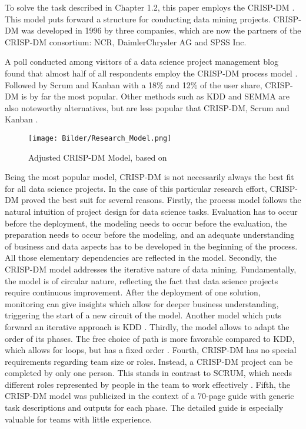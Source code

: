 To solve the task described in Chapter 1.2, this paper employs the \ac{CRISP-DM} \cite{CRISPDM2000}. This model puts forward a structure for conducting data mining projects. \ac{CRISP-DM} was developed in 1996 by three companies, which are now the partners of the \ac{CRISP-DM} consortium: NCR, DaimlerChrysler AG and SPSS Inc. 

A poll conducted among visitors of a data science project management blog found that almost half of all respondents employ the \ac{CRISP-DM} process model \cite{CRISPDMPopular2020} . Followed by Scrum and Kanban with a 18\% and 12\% of the user share, \ac{CRISP-DM} is by far the most popular. Other methods such as \ac{KDD} and \ac{SEMMA} are also noteworthy alternatives, but are less popular that CRISP-DM, Scrum and Kanban \cite{CRISPDMPopular2020} .

\begin{figure}[ht]
	\centering
	\texttt{[image: Bilder/Research\_Model.png]}
	\caption[Adjusted CRISP-DM Model]{Adjusted CRISP-DM Model, based on \cite[p.~13]{CRISPDM2000}}
	\label{fig:CRISM-DM}
\end{figure}

Being the most popular model, \ac{CRISP-DM} is not necessarily always the best fit for all data science projects. In the case of this particular research effort, \ac{CRISP-DM} proved the best suit for several reasons.
Firstly, the process model follows the natural intuition of project design for data science tasks. Evaluation has to occur before the deployment, the modeling needs to occur before the evaluation, the preparation needs to occur before the modeling, and an adequate understanding of business and data aspects has to be developed in the beginning of the process. All those elementary dependencies are reflected in the model.
Secondly, the \ac{CRISP-DM} model addresses the iterative nature of data mining. Fundamentally, the model is of circular nature, reflecting the fact that data science projects require continuous improvement. After the deployment of one solution, monitoring can give insights which allow for deeper business understanding, triggering the start of a new circuit of the model. Another model which puts forward an iterative approach is \ac{KDD} \cite[p.~41]{KDD}.
Thirdly, the model allows to adapt the order of its phases. The free choice of path is more favorable compared to \ac{KDD}, which allows for loops, but has a fixed order \cite[p.~42]{KDD}.
Fourth, \ac{CRISP-DM} has no special requirements regarding team size or roles. Instead, a \ac{CRISP-DM} project can be completed by only one person. This stands in contrast to SCRUM, which needs different roles represented by people in the team to work effectively \cite{SCRUMSolo}. 
Fifth, the \ac{CRISP-DM} model was publicized in the context of a 70-page guide with generic task descriptions and outputs for each phase. The detailed guide is especially valuable for teams with little experience.

